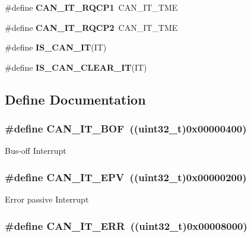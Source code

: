 \begin{DoxyCompactItemize}
\item 
\hypertarget{group__CAN__interrupts_ga42e5c8e89e0f06f3250916fcfb21dc22}{
\#define {\bfseries CAN\_\-IT\_\-RQCP1}~CAN\_\-IT\_\-TME}
\label{group__CAN__interrupts_ga42e5c8e89e0f06f3250916fcfb21dc22}

\item 
\hypertarget{group__CAN__interrupts_gacc634c3e29cdc9622081021dcda3127b}{
\#define {\bfseries CAN\_\-IT\_\-RQCP2}~CAN\_\-IT\_\-TME}
\label{group__CAN__interrupts_gacc634c3e29cdc9622081021dcda3127b}

\item 
\#define {\bfseries IS\_\-CAN\_\-IT}(IT)
\item 
\#define {\bfseries IS\_\-CAN\_\-CLEAR\_\-IT}(IT)
\end{DoxyCompactItemize}


\subsection{Define Documentation}
\hypertarget{group__CAN__interrupts_gad63c39e6237aa07681a1f8ce2ff9e167}{
\subsubsection[{CAN\_\-IT\_\-BOF}]{\setlength{\rightskip}{0pt plus 5cm}\#define CAN\_\-IT\_\-BOF~((uint32\_\-t)0x00000400)}}
\label{group__CAN__interrupts_gad63c39e6237aa07681a1f8ce2ff9e167}
Bus-\/off Interrupt \hypertarget{group__CAN__interrupts_ga006b7b641d337a599ceac64b483e75dd}{
\subsubsection[{CAN\_\-IT\_\-EPV}]{\setlength{\rightskip}{0pt plus 5cm}\#define CAN\_\-IT\_\-EPV~((uint32\_\-t)0x00000200)}}
\label{group__CAN__interrupts_ga006b7b641d337a599ceac64b483e75dd}
Error passive Interrupt \hypertarget{group__CAN__interrupts_ga65f1781c9165a2e9b5f77f1ed3990741}{
\subsubsection[{CAN\_\-IT\_\-ERR}]{\setlength{\rightskip}{0pt plus 5cm}\#define CAN\_\-IT\_\-ERR~((uint32\_\-t)0x00008000)}}
